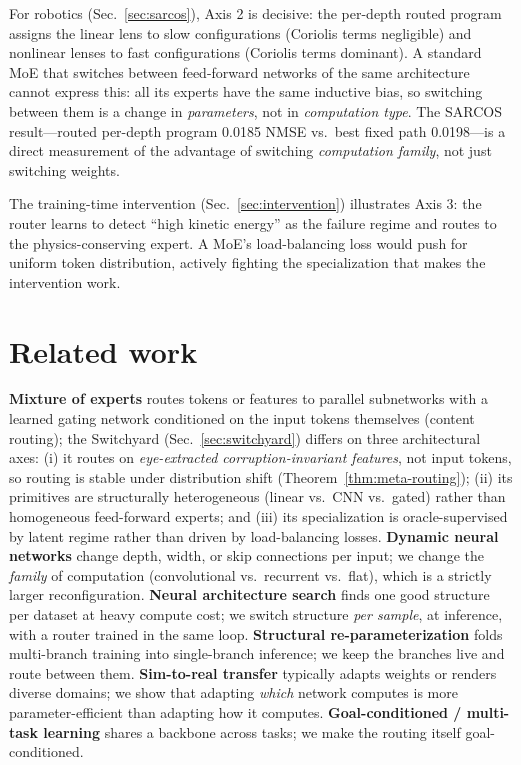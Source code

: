\documentclass[11pt,a4paper]{article}
\begin{document}
For robotics (Sec.~\ref{sec:sarcos}), Axis 2 is decisive: the per-depth
routed program assigns the linear lens to slow configurations (Coriolis terms
negligible) and nonlinear lenses to fast configurations (Coriolis terms
dominant). A standard MoE that switches between feed-forward networks of
the same architecture cannot express this: all its experts have the same
inductive bias, so switching between them is a change in \emph{parameters},
not in \emph{computation type}. The SARCOS result---routed per-depth program
0.0185 NMSE vs.\ best fixed path 0.0198---is a direct measurement of the
advantage of switching \emph{computation family}, not just switching weights.

The training-time intervention (Sec.~\ref{sec:intervention}) illustrates
Axis 3: the router learns to detect ``high kinetic energy'' as the failure
regime and routes to the physics-conserving expert. A MoE's load-balancing
loss would push for uniform token distribution, actively fighting the
specialization that makes the intervention work.

\section{Related work}
\label{sec:related}

\textbf{Mixture of experts} \cite{switchtransformer,condcomp} routes tokens or features to parallel subnetworks with a learned gating network conditioned on the input tokens themselves (content routing); the Switchyard (Sec.~\ref{sec:switchyard}) differs on three architectural axes: (i) it routes on \emph{eye-extracted corruption-invariant features}, not input tokens, so routing is stable under distribution shift (Theorem~\ref{thm:meta-routing}); (ii) its primitives are structurally heterogeneous (linear vs.\ CNN vs.\ gated) rather than homogeneous feed-forward experts; and (iii) its specialization is oracle-supervised by latent regime rather than driven by load-balancing losses. \textbf{Dynamic neural networks} \cite{dynamicnn} change depth, width, or skip connections per input; we change the \emph{family} of computation (convolutional vs.\ recurrent vs.\ flat), which is a strictly larger reconfiguration. \textbf{Neural architecture search} \cite{nasmethods} finds one good structure per dataset at heavy compute cost; we switch structure \emph{per sample}, at inference, with a router trained in the same loop. \textbf{Structural re-parameterization} \cite{repvgg} folds multi-branch training into single-branch inference; we keep the branches live and route between them. \textbf{Sim-to-real transfer} \cite{domainrand,sim2real} typically adapts weights or renders diverse domains; we show that adapting \emph{which} network computes is more parameter-efficient than adapting how it computes. \textbf{Goal-conditioned / multi-task learning} \cite{mtl} shares a backbone across tasks; we make the routing itself goal-conditioned.
\end{document}
